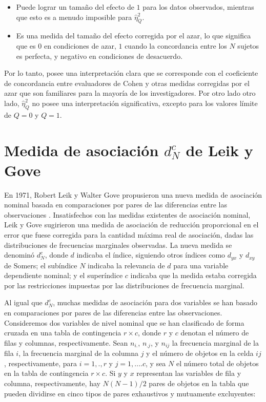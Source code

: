 \documentclass[12pt,a4paper,]{book}
\numberwithin{dummy}{section}
\theoremstyle{ocrenumbox}
\theoremstyle{blacknumex}
\theoremstyle{blacknumbox}
\theoremstyle{ocrenum}
\theoremstyle{ocrenum}
\begin{document}
\begin{itemize}
\item
  Puede lograr un tamaño del efecto de \(1\) para los datos observados,
  mientras que esto es a menudo imposible para \(\hat\eta_Q^2\).
\item
  Es una medida del tamaño del efecto corregida por el azar, lo que
  significa que es \(0\) en condiciones de azar, \(1\) cuando la
  concordancia entre los \(N\) sujetos es perfecta, y negativo en
  condiciones de desacuerdo.
\end{itemize}

Por lo tanto, posee una interpretación clara que se corresponde con el
coeficiente de concordancia entre evaluadores de Cohen y otras medidas
corregidas por el azar que son familiares para la mayoría de los
investigadores. Por otro lado otro lado, \(\hat\eta_Q^2\) no posee una
interpretación significativa, excepto para los valores límite de
\(Q = 0\) y \(Q = 1\).

\hypertarget{medida-de-asociaciuxf3n-dc_n-de-leik-y-gove}{%
\section{\texorpdfstring{Medida de asociación \(d^c_N\) de Leik y
Gove}{Medida de asociación d\^{}c\_N de Leik y Gove}}\label{medida-de-asociaciuxf3n-dc_n-de-leik-y-gove}}

En 1971, Robert Leik y Walter Gove propusieron una nueva medida de
asociación nominal basada en comparaciones por pares de las diferencias
entre las observaciones \citep{Leik1971}. Insatisfechos con las medidas
existentes de asociación nominal, Leik y Gove sugirieron una medida de
asociación de reducción proporcional en el error que fuese corregida
para la cantidad máxima real de asociación, dadas las distribuciones de
frecuencias marginales observadas. La nueva medida se denominó
\(d_N^c\), donde \(d\) indicaba el índice, siguiendo otros índices como
\(d_{yx}\) y \(d_{xy}\) de Somers; el subíndice \(N\) indicaba la
relevancia de \(d\) para una variable dependiente nominal; y el
superíndice \(c\) indicaba que la medida estaba corregida por las
restricciones impuestas por las distribuciones de frecuencia marginal.

Al igual que \(d_N^c\), muchas medidas de asociación para dos variables
se han basado en comparaciones por pares de las diferencias entre las
observaciones. Consideremos dos variables de nivel nominal que se han
clasificado de forma cruzada en una tabla de contingencia \(r\times c\),
donde \(r\) y \(c\) denotan el número de filas y columnas,
respectivamente. Sean \(n_{i.}\), \(n_{.j}\), y \(n_{ij}\) la frecuencia
marginal de la fila \(i\), la frecuencia marginal de la columna \(j\) y
el número de objetos en la celda \({ij}\), respectivamente, para
\(i = 1, . , r\) y \(j = 1, . . . . c\), y sea \(N\) el número total de
objetos en la tabla de contingencia \(r\times c\). Si \(y\) y \(x\)
representan las variables de fila y columna, respectivamente, hay
\(N(N - 1)/2\) pares de objetos en la tabla que pueden dividirse en
cinco tipos de pares exhaustivos y mutuamente excluyentes:
\end{document}
